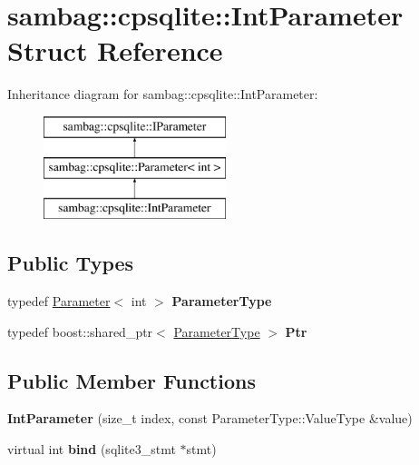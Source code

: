 \hypertarget{structsambag_1_1cpsqlite_1_1_int_parameter}{
\section{sambag::cpsqlite::IntParameter Struct Reference}
\label{structsambag_1_1cpsqlite_1_1_int_parameter}
}
Inheritance diagram for sambag::cpsqlite::IntParameter:\begin{figure}[H]
\begin{center}
\leavevmode
\includegraphics[height=3.000000cm]{structsambag_1_1cpsqlite_1_1_int_parameter}
\end{center}
\end{figure}
\subsection*{Public Types}
\begin{DoxyCompactItemize}
\item 
\hypertarget{structsambag_1_1cpsqlite_1_1_int_parameter_aa5df2bf87714a1122d60e5c0212b7bc1}{
typedef \hyperlink{structsambag_1_1cpsqlite_1_1_parameter}{Parameter}$<$ int $>$ {\bfseries ParameterType}}
\label{structsambag_1_1cpsqlite_1_1_int_parameter_aa5df2bf87714a1122d60e5c0212b7bc1}

\item 
\hypertarget{structsambag_1_1cpsqlite_1_1_int_parameter_a4b5d5eb2ea0207e86181f31561cc7ff9}{
typedef boost::shared\_\-ptr$<$ \hyperlink{structsambag_1_1cpsqlite_1_1_parameter}{ParameterType} $>$ {\bfseries Ptr}}
\label{structsambag_1_1cpsqlite_1_1_int_parameter_a4b5d5eb2ea0207e86181f31561cc7ff9}

\end{DoxyCompactItemize}
\subsection*{Public Member Functions}
\begin{DoxyCompactItemize}
\item 
\hypertarget{structsambag_1_1cpsqlite_1_1_int_parameter_a97ee65314734da68f904a9a8e48a87ae}{
{\bfseries IntParameter} (size\_\-t index, const ParameterType::ValueType \&value)}
\label{structsambag_1_1cpsqlite_1_1_int_parameter_a97ee65314734da68f904a9a8e48a87ae}

\item 
\hypertarget{structsambag_1_1cpsqlite_1_1_int_parameter_af55942bc7c8ca68fc7a533bc418366fd}{
virtual int {\bfseries bind} (sqlite3\_\-stmt $\ast$stmt)}
\label{structsambag_1_1cpsqlite_1_1_int_parameter_af55942bc7c8ca68fc7a533bc418366fd}

\end{DoxyCompactItemize}
